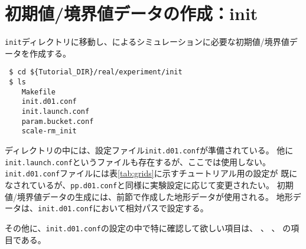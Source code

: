 \section{初期値/境界値データの作成：init} \label{sec:tutorial_real_init}

\verb|init|ディレクトリに移動し、\scalerm によるシミュレーションに必要な初期値/境界値データを作成する。
\begin{verbatim}
 $ cd ${Tutorial_DIR}/real/experiment/init
 $ ls
    Makefile
    init.d01.conf
    init.launch.conf
    param.bucket.conf
    scale-rm_init
\end{verbatim}
ディレクトリの中には、設定ファイル\verb|init.d01.conf|が準備されている。
他に\verb|init.launch.conf|というファイルも存在するが、ここでは使用しない。
\verb|init.d01.conf|ファイルには表\ref{tab:grids}に示すチュートリアル用の設定が
既になされているが、\verb|pp.d01.conf|と同様に実験設定に応じて変更されたい。
初期値/境界値データの生成には、前節で作成した地形データが使用される。
地形データは、\verb|init.d01.conf|において相対パスで設定する。

その他に、\verb|init.d01.conf|の設定の中で特に確認して欲しい項目は、
、
、
の項目である。


